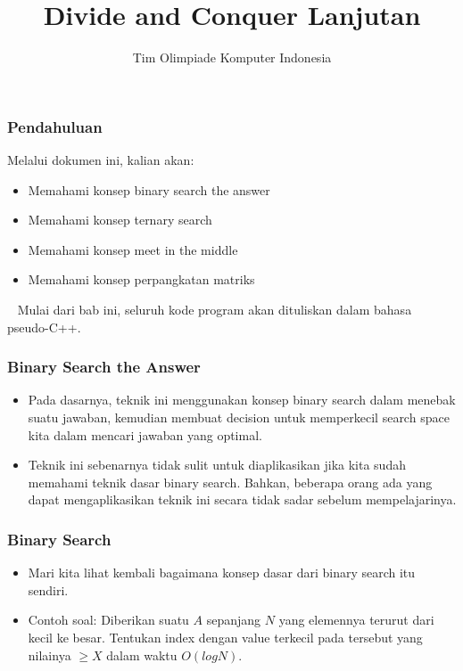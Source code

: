 

\title{Divide and Conquer Lanjutan}
\author{Tim Olimpiade Komputer Indonesia}
\date{}



\begin{frame}
\titlepage
\end{frame}

\begin{frame}
\frametitle{Pendahuluan}
Melalui dokumen ini, kalian akan:
\begin{itemize}
  \item Memahami konsep binary search the answer
  \item Memahami konsep ternary search
  \item Memahami konsep meet in the middle
  \item Memahami konsep perpangkatan matriks
\end{itemize}
~\newline
Mulai dari bab ini, seluruh kode program akan dituliskan dalam bahasa pseudo-C++.
\end{frame}

\begin{frame}
\frametitle{Binary Search the Answer}
\begin{itemize}
  \item Pada dasarnya, teknik ini menggunakan konsep binary search dalam menebak suatu jawaban, kemudian membuat decision untuk memperkecil search space kita dalam mencari jawaban yang optimal.
  \item Teknik ini sebenarnya tidak sulit untuk diaplikasikan jika kita sudah memahami teknik dasar binary search. Bahkan, beberapa orang ada yang dapat mengaplikasikan teknik ini secara tidak sadar sebelum mempelajarinya.
\end{itemize}
\end{frame}

\begin{frame}
\frametitle{Binary Search}
\begin{itemize}
  \item Mari kita lihat kembali bagaimana konsep dasar dari binary search itu sendiri.
  \item Contoh soal: Diberikan suatu \farray $A$ sepanjang $N$ yang elemennya terurut dari kecil ke besar. Tentukan index dengan value terkecil pada \farray tersebut yang nilainya $ \ge X$ dalam waktu $O(log N)$.
\end{itemize}
\end{frame}

